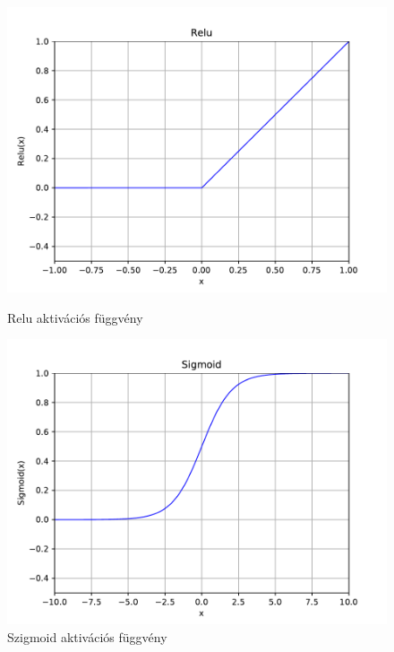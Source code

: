 \begin{figure} [h!]
	
	\begin{minipage}[c]{0.5\linewidth}
		\centering
		\includegraphics[width=\textwidth]{img/relu.pdf}
		\caption{Relu aktivációs függvény}
		\label{fig:relu}
		
	\end{minipage}\hfill
	\begin{minipage}[c]{0.5\linewidth}
		\centering
		\includegraphics[width=\textwidth]{img/sigmoid.pdf}
		\caption{Szigmoid aktivációs függvény}
		\label{fig:sigmoid}
		
	\end{minipage}
\end{figure}

